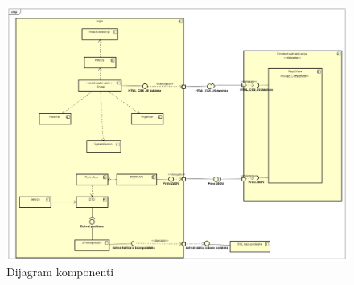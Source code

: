 	\begin{figure}[H]
		\begin{center}
			\includegraphics[width=17cm]{slike/compdig.PNG}
		\end{center}
		\caption{Dijagram komponenti}
		\label{fig:dijakt}
	\end{figure}
	
	\eject	
